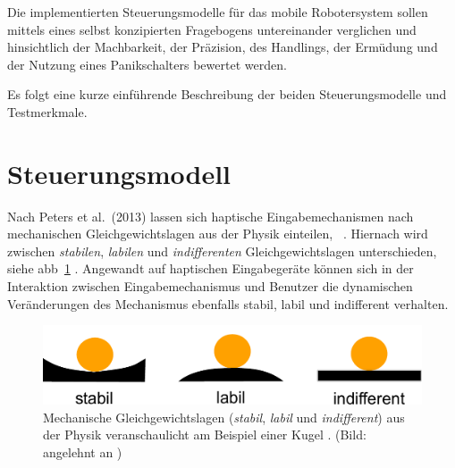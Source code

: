 Die implementierten Steuerungsmodelle für das mobile Robotersystem sollen mittels eines selbst konzipierten Fragebogens untereinander verglichen und hinsichtlich der Machbarkeit, der Präzision, des Handlings, der Ermüdung und der Nutzung eines Panikschalters bewertet werden. 

Es folgt eine kurze einführende Beschreibung der beiden Steuerungsmodelle und Testmerkmale.

\section{Steuerungsmodell}
\label{section:steurungsmodell} 

Nach Peters et al.~(2013) lassen sich haptische Eingabemechanismen nach mechanischen Gleichgewichtslagen aus der Physik einteilen, \vgl~\cite[S.118]{Peters2013}. Hiernach wird zwischen \textit{stabilen}, \textit{labilen} und \textit{indifferenten} Gleichgewichtslagen unterschieden, siehe \acs{abb}~\ref{fig:kugel} \cite{Peters2013}. Angewandt auf haptischen Eingabegeräte können sich in der Interaktion zwischen Eingabemechanismus und Benutzer die dynamischen Veränderungen des Mechanismus ebenfalls stabil, labil und indifferent verhalten.

\begin{figure}[ht]
\centering 
  \begin{minipage}[b]{0.8\linewidth} 
\includegraphics[width=\textwidth]{bilder/grundlagen/kugelang.pdf}
   \end{minipage}%
   \hfill
   \caption{Mechanische Gleichgewichtslagen (\textit{stabil}, \textit{labil} und \textit{indifferent}) aus der Physik veranschaulicht am Beispiel einer Kugel \cite{Peters2013}. (Bild: angelehnt an \cite[S.118]{Peters2013})}\label{fig:kugel} 
\end{figure}

